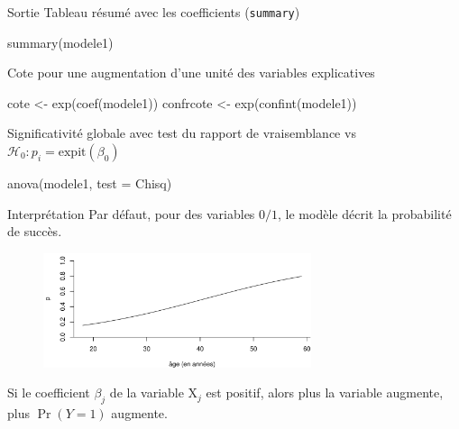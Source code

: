 \documentclass[
  ignorenonframetext,
]{beamer}
\newenvironment{Shaded}{\begin{snugshade}}{\end{snugshade}}
\newcommand{\AttributeTok}[1]{\textcolor[rgb]{0.40,0.45,0.13}{#1}}
\newcommand{\FunctionTok}[1]{\textcolor[rgb]{0.28,0.35,0.67}{#1}}
\newcommand{\NormalTok}[1]{\textcolor[rgb]{0.00,0.23,0.31}{#1}}
\newcommand{\OtherTok}[1]{\textcolor[rgb]{0.00,0.23,0.31}{#1}}
\newcommand{\StringTok}[1]{\textcolor[rgb]{0.13,0.47,0.30}{#1}}
\begin{document}
\begin{frame}[fragile]{Sortie}
\protect\hypertarget{sortie}{}
Tableau résumé avec les coefficients (\texttt{summary})

\begin{Shaded}
\begin{Highlighting}[numbers=left,,]
\FunctionTok{summary}\NormalTok{(modele1)}
\end{Highlighting}
\end{Shaded}

Cote pour une augmentation d'une unité des variables explicatives

\begin{Shaded}
\begin{Highlighting}[numbers=left,,]
\NormalTok{cote }\OtherTok{\textless{}{-}} \FunctionTok{exp}\NormalTok{(}\FunctionTok{coef}\NormalTok{(modele1))}
\NormalTok{confrcote }\OtherTok{\textless{}{-}} \FunctionTok{exp}\NormalTok{(}\FunctionTok{confint}\NormalTok{(modele1))}
\end{Highlighting}
\end{Shaded}

Significativité globale avec test du rapport de vraisemblance vs
\(\mathscr{H}_0: p_i = \mathrm{expit}(\beta_0)\)

\begin{Shaded}
\begin{Highlighting}[numbers=left,,]
\FunctionTok{anova}\NormalTok{(modele1, }\AttributeTok{test =} \StringTok{\textquotesingle{}Chisq\textquotesingle{}}\NormalTok{)}
\end{Highlighting}
\end{Shaded}
\end{frame}

\begin{frame}{Interprétation}
\protect\hypertarget{interpruxe9tation}{}
Par défaut, pour des variables \(0/1\), le modèle décrit la probabilité
de succès.

\begin{figure}

{\centering \includegraphics[width=0.7\textwidth,height=\textheight]{MATH60602-diapos6_files/figure-beamer/logitplot2-1.pdf}

}

\end{figure}

Si le coefficient \(\beta_j\) de la variable \(\mathrm{X}_j\) est
positif, alors plus la variable augmente, plus \(\Pr(Y=1)\) augmente.
\end{frame}
\end{document}
